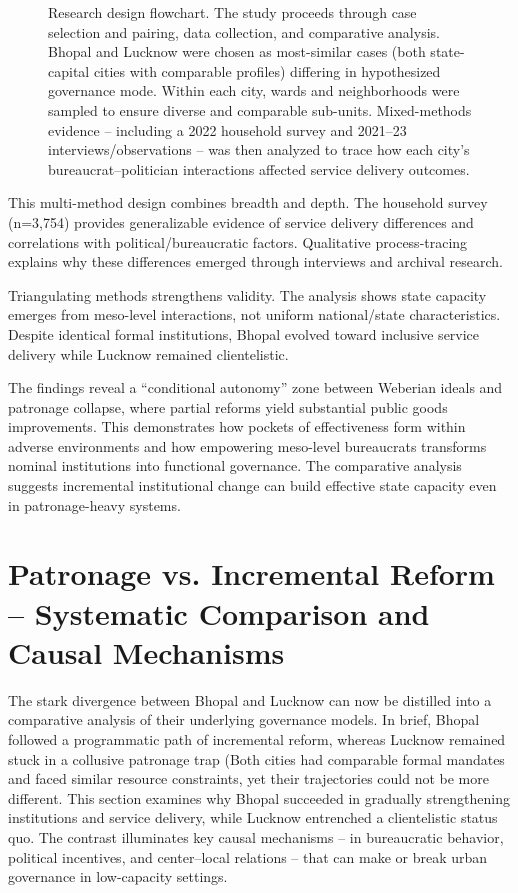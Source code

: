 \begin{figure}[htbp]
\centering
\caption{Research design flowchart. The study proceeds through case selection and pairing, data collection, and comparative analysis. Bhopal and Lucknow were chosen as most-similar cases (both state-capital cities with comparable profiles) differing in hypothesized governance mode. Within each city, wards and neighborhoods were sampled to ensure diverse and comparable sub-units. Mixed-methods evidence – including a 2022 household survey and 2021–23 interviews/observations – was then analyzed to trace how each city's bureaucrat–politician interactions affected service delivery outcomes.}
\label{fig:flowchart}
\end{figure}

This multi-method design combines breadth and depth. The household survey (n=3,754) provides generalizable evidence of service delivery differences and correlations with political/bureaucratic factors. Qualitative process-tracing explains why these differences emerged through interviews and archival research.

Triangulating methods strengthens validity. The analysis shows state capacity emerges from meso-level interactions, not uniform national/state characteristics. Despite identical formal institutions, Bhopal evolved toward inclusive service delivery while Lucknow remained clientelistic.

The findings reveal a ``conditional autonomy'' zone between Weberian ideals and patronage collapse, where partial reforms yield substantial public goods improvements. This demonstrates how pockets of effectiveness form within adverse environments and how empowering meso-level bureaucrats transforms nominal institutions into functional governance. The comparative analysis suggests incremental institutional change can build effective state capacity even in patronage-heavy systems.

\section{Patronage vs. Incremental Reform – Systematic Comparison and Causal Mechanisms}

The stark divergence between Bhopal and Lucknow can now be distilled into a comparative analysis of their underlying governance models. In brief, Bhopal followed a programmatic path of incremental reform, whereas Lucknow remained stuck in a collusive patronage trap (Both cities had comparable formal mandates and faced similar resource constraints, yet their trajectories could not be more different. This section examines why Bhopal succeeded in gradually strengthening institutions and service delivery, while Lucknow entrenched a clientelistic status quo. The contrast illuminates key causal mechanisms – in bureaucratic behavior, political incentives, and center–local relations – that can make or break urban governance in low-capacity settings.

